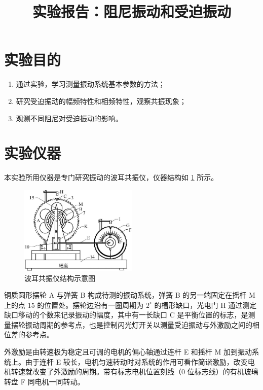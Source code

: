 \documentclass[12pt,a4paper]{amsart}
\title{实验报告：阻尼振动和受迫振动}
\begin{document}
\maketitle

\section{实验目的}

\begin{enumerate}
	\item 通过实验，学习测量振动系统基本参数的方法；
	\item 研究受迫振动的幅频特性和相频特性，观察共振现象；
	\item 观测不同阻尼对受迫振动的影响。
\end{enumerate}

\section{实验仪器}

本实验所用仪器是专门研究振动的波耳共振仪，仪器结构如 \ref{fig:instruments} 所示。

\begin{figure}[H]
	\centering
	\includegraphics[width=0.5\textwidth]{img/instruments.jpg}
	\caption{波耳共振仪结构示意图}
	\label{fig:instruments}
\end{figure}

铜质圆形摆轮 A 与弹簧 B 构成待测的振动系统，弹簧 B 的另一端固定在摇杆 M 上的点 15 的位置处。摆轮边沿有一圈周期为 $2^\circ$ 的槽形缺口，光电门 H 通过测定缺口移动的个数来记录振动的幅度，其中有一长缺口 C 是平衡位置的标志，是测量摆轮振动周期的参考点，也是控制闪光灯开关以测量受迫振动与外激励之间的相位差的参考点。

外激励是由转速极为稳定且可调的电机的偏心轴通过连杆 E 和摇杆 M 加到振动系统上。由于连杆 E 较长，电机匀速转动时对系统的作用可看作简谐激励，改变电机转速就改变了外激励的周期。带有标志电机位置刻线（0 位标志线）的有机玻璃转盘 F 同电机一同转动。
\end{document}
